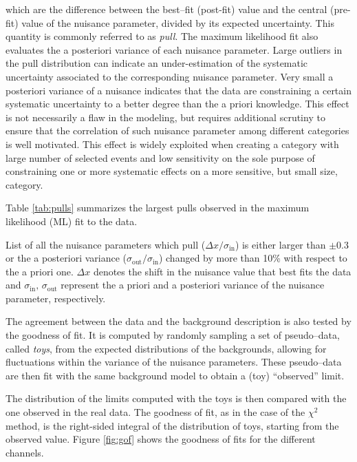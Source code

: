 which are the difference between the best--fit (post-fit) value and the central (pre-fit) value of the nuisance parameter, divided by its expected uncertainty. This quantity is commonly referred to as \emph{pull}. The maximum likelihood fit also evaluates the a posteriori variance of each nuisance parameter. Large outliers in the pull distribution can indicate an under-estimation of the systematic uncertainty associated to the corresponding nuisance parameter. Very small a posteriori variance of a nuisance indicates that the data are constraining a certain systematic uncertainty to a better degree than the a priori knowledge. This effect is not necessarily a flaw in the modeling, but requires additional scrutiny to ensure that the correlation of such nuisance parameter among different categories is well motivated. This effect is widely exploited when creating a category with large number of selected events and low sensitivity on the sole purpose of constraining one or more systematic effects on a more sensitive, but small size, category. 

Table \ref{tab:pulls} summarizes the largest pulls observed in the maximum likelihood (ML) fit to the data.

\begin{table}
\caption{List of all the nuisance parameters which pull ($\Delta x/\sigma_{\text{in}}$) is either larger than $\pm0.3$ or the a posteriori variance ($\sigma_{\text{out}}/\sigma_{\text{in}}$) changed by more than 10\% with respect to the a priori one. $\Delta x$ denotes the shift in the nuisance value that best fits the data and $\sigma_{\text{in}}, \,\sigma_{\text{out}}$ represent the a priori and a posteriori variance of the nuisance parameter, respectively.}

\label{tab:pulls}
\end{table}

The agreement between the data and the background description is also tested by the goodness of fit. It is computed by randomly sampling a set of pseudo--data, called \emph{toys}, from the expected distributions of the backgrounds, allowing for fluctuations within the variance of the nuisance parameters. These pseudo--data are then fit with the same background model to obtain a (toy) ``observed'' limit. 

The distribution of the limits computed with the toys is then compared with the one observed in the real data. The goodness of fit, as in the case of the $\chi^2$ method, is the right-sided integral of the distribution of toys, starting from the observed value. Figure \ref{fig:gof} shows the goodness of fits for the different channels.

